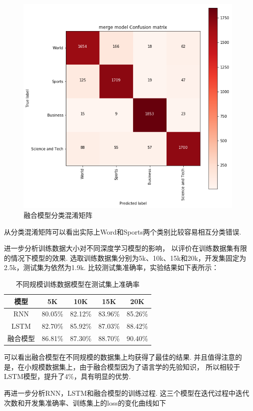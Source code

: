 \documentclass[bachelor,adobefonts]{jnuthesis}
\begin{document}
\begin{figure}[h!]
  \centering
    \includegraphics[width=0.45\linewidth]{混淆矩阵.png}
  \caption{融合模型分类混淆矩阵}
\end{figure}

从分类混淆矩阵可以看出实际上Word和Sports两个类别比较容易相互分类错误.

进一步分析训练数据大小对不同深度学习模型的影响，
以评价在训练数据集有限的情况下模型的效果.
选取训练数据集分别为5k、10k、15k和20k，开发集固定为2.5k，测试集为依然为1.9k.
比较测试集准确率，实验结果如下表所示：

\begin{table}[h!]
  \centering
  \begin{tabular}{ccccc}
    \toprule
    \textbf{模型} & \textbf{5K} & \textbf{10K} & \textbf{15K} & \textbf{20K}\\
    \midrule
    RNN & 80.05\% & 82.12\% & 83.96\% & 85.26\%\\
    LSTM & 82.70\% & 85.92\% & 87.03\% & 88.42\%\\
    融合模型 & 86.81\% & 87.30\% & 88.70\% & 90.40\%\\
    \bottomrule
  \end{tabular}
  \caption{不同规模训练数据模型在测试集上准确率}
\end{table}

可以看出融合模型在不同规模的数据集上均获得了最佳的结果.
并且值得注意的是，在小规模数据集上，由于融合模型因为了语言学的先验知识，
所以相较于LSTM模型，提升了4\%，具有明显的优势.

再进一步分析RNN，LSTM和融合模型的训练过程.
这三个模型在迭代过程中迭代次数和开发集准确率、训练集上的loss的变化曲线如下
\end{document}
